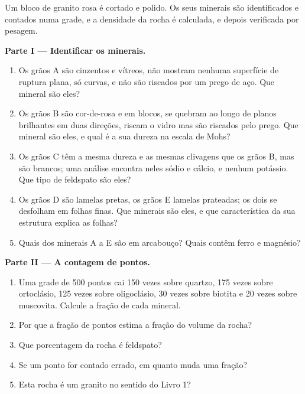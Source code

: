\begin{problem}
\label{pb:g11:minerals:1}
Um bloco de granito rosa é cortado e polido. Os seus minerais são
identificados e contados numa grade, e a densidade da rocha é calculada, e
depois verificada por pesagem.

\medskip
\noindent\textbf{Parte I --- Identificar os minerais.}
\begin{enumerate}
  \item Os grãos A são cinzentos e vítreos, não mostram nenhuma superfície
        de ruptura plana, só curvas, e não são riscados por um prego de aço.
        Que mineral são eles?
  \item Os grãos B são cor-de-rosa e em blocos, se quebram ao longo de
        planos brilhantes em duas direções, riscam o vidro mas são riscados
        pelo prego. Que mineral são eles, e qual é a sua dureza na escala de
        Mohs?
  \item Os grãos C têm a mesma dureza e as mesmas clivagens que os grãos B,
        mas são brancos; uma análise encontra neles sódio e cálcio, e nenhum
        potássio. Que tipo de feldspato são eles?
  \item Os grãos D são lamelas pretas, os grãos E lamelas prateadas; os dois
        se desfolham em folhas finas. Que minerais são eles, e que
        característica da sua estrutura explica as folhas?
  \item Quais dos minerais A a E são  em arcabouço? Quais contêm
        ferro e magnésio?
\end{enumerate}

\medskip
\noindent\textbf{Parte II --- A contagem de pontos.}
\begin{enumerate}[resume]
  \item Uma grade de 500 pontos cai 150 vezes sobre quartzo, 175 vezes sobre
        ortoclásio, 125 vezes sobre oligoclásio, 30 vezes sobre biotita e 20
        vezes sobre muscovita. Calcule a fração de cada mineral.
  \item Por que a fração de pontos estima a fração do volume da rocha?
  \item Que porcentagem da rocha é feldspato?
  \item Se um ponto for contado errado, em quanto muda uma fração?
  \item Esta rocha é um granito no sentido do Livro 1?
\end{enumerate}


\end{problem}
